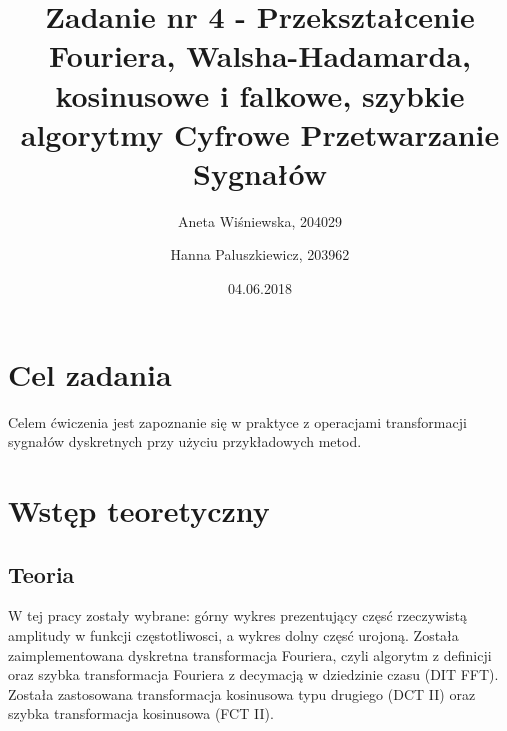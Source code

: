 \documentclass[12pt]{article}
\title{{\bf Zadanie nr 4 - Przekształcenie Fouriera, Walsha-Hadamarda, kosinusowe i falkowe, szybkie algorytmy}\linebreak
Cyfrowe Przetwarzanie Sygnałów}
\author{Aneta Wiśniewska, 204029 \and Hanna Paluszkiewicz, 203962}
\date{04.06.2018}
\begin{document}
\clearpage\maketitle
\thispagestyle{empty}
\newpage
\setcounter{page}{1}
\section{Cel zadania}

Celem ćwiczenia jest zapoznanie się w praktyce z  operacjami transformacji sygnałów dyskretnych przy użyciu przykładowych metod. 

\section{Wstęp teoretyczny}

\subsection{Teoria}

W tej pracy zostały wybrane: górny wykres prezentujący częsć rzeczywistą amplitudy w funkcji częstotliwosci, a wykres dolny częsć urojoną. Została zaimplementowana dyskretna transformacja Fouriera, czyli algorytm z definicji oraz szybka transformacja Fouriera z decymacją w dziedzinie czasu (DIT FFT). Została zastosowana transformacja kosinusowa typu drugiego (DCT II) oraz szybka transformacja kosinusowa (FCT II).
\end{document}
